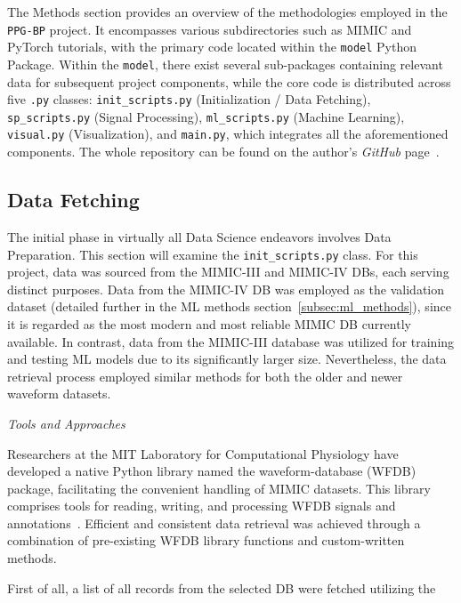 The Methods section provides an overview of the methodologies employed in the \texttt{PPG-BP} project.
It encompasses various subdirectories such as MIMIC and PyTorch tutorials, with the primary code located within the \texttt{model} Python Package.
Within the \texttt{model}, there exist several sub-packages containing relevant data for subsequent project components,
while the core code is distributed across five \texttt{.py} classes: \texttt{init\_scripts.py} (Initialization / Data Fetching), \texttt{sp\_scripts.py} (Signal Processing),
\texttt{ml\_scripts.py} (Machine Learning), \texttt{visual.py} (Visualization), and \texttt{main.py}, which integrates all the aforementioned components.
The whole repository can be found on the author's \textit{GitHub} page~\cite{jasinskasHtjasPPGBP2024}.

\subsection{Data Fetching}
\label{subsec:data-fetching}

The initial phase in virtually all Data Science endeavors involves Data Preparation.
This section will examine the \texttt{init\_scripts.py} class.
For this project, data was sourced from the MIMIC-III and MIMIC-IV DBs, each serving distinct purposes.
Data from the MIMIC-IV DB was employed as the validation dataset (detailed further in the ML methods section~\ref{subsec:ml_methods}), since it is regarded as the most modern and most reliable MIMIC DB currently available.
In contrast, data from the MIMIC-III database was utilized for training and testing ML models due to its significantly larger size.
Nevertheless, the data retrieval process employed similar methods for both the older and newer waveform datasets.

\vspace{0.2cm}
\textit{Tools and Approaches}
\vspace{0.2cm}

Researchers at the MIT Laboratory for Computational Physiology have developed a native Python library named the waveform-database (WFDB) package, facilitating the convenient handling of MIMIC datasets.
This library comprises tools for reading, writing, and processing WFDB signals and annotations~\cite{MITLCPWfdbpython2024}.
Efficient and consistent data retrieval was achieved through a combination of pre-existing WFDB library functions and custom-written methods.

First of all, a list of all records from the selected DB were fetched utilizing the

